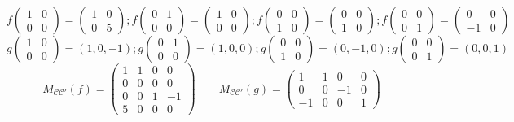 \documentclass[11pt,a4paper]{article}
\begin{document}
\[
f\begin{pmatrix}1&0\\0&0\end{pmatrix}=\begin{pmatrix}1&0\\0&5\end{pmatrix}; f\begin{pmatrix}0&1\\0&0\end{pmatrix}=\begin{pmatrix}1&0\\0&0\end{pmatrix}; f\begin{pmatrix}0&0\\1&0\end{pmatrix}=\begin{pmatrix}0&0\\1&0\end{pmatrix}; f\begin{pmatrix}0&0\\0&1\end{pmatrix}=\begin{pmatrix}0&0\\-1&0\end{pmatrix}
\]
\[
g\begin{pmatrix}1&0\\0&0\end{pmatrix}=(1,0,-1); g\begin{pmatrix}0&1\\0&0\end{pmatrix}=(1,0,0); g\begin{pmatrix}0&0\\1&0\end{pmatrix}=(0,-1,0); g\begin{pmatrix}0&0\\0&1\end{pmatrix}=(0,0,1)
\]
\[
M_{\mathcal{CC'}}(f)=\begin{pmatrix}
1&1&0&0\\0&0&0&0\\0&0&1&-1\\5&0&0&0
\end{pmatrix} \quad \quad
M_{\mathcal{CC'}}(g)=\begin{pmatrix}
1&1&0&0\\0&0&-1&0\\-1&0&0&1
\end{pmatrix}
\]
\end{document}
